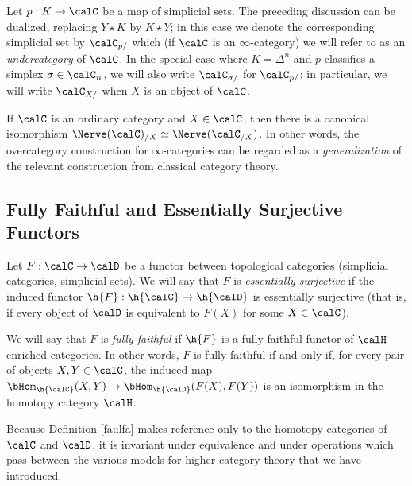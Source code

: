 \begin{remark} Let $p: K \rightarrow \calC$ be a map of simplicial sets. The
preceding discussion can be dualized, replacing $Y \star K$
by $K \star Y$; in this case we denote the corresponding simplicial set
by $\calC_{p/}$ which (if $\calC$ is an $\infty$-category) we will refer to as an
{\it undercategory} of $\calC$. In the special case where $K = \Delta^n$ and $p$ classifies a simplex $\sigma \in \calC_{n}$, we will also write $\calC_{\sigma/}$ for $\calC_{p/}$; in particular, we will write $\calC_{X/}$ when $X$ is an object of $\calC$.
\end{remark}

\begin{remark}
If $\calC$ is an ordinary category and $X \in \calC$,
then there is a canonical isomorphism $\Nerve(\calC)_{/X} \simeq \Nerve (\calC_{/X})$. In other words, the overcategory construction for $\infty$-categories can be regarded as a {\em generalization} of the relevant construction from classical category theory.
\end{remark}

\subsection{Fully Faithful and Essentially Surjective Functors}

\begin{definition}\label{faulfa}
Let $F: \calC \rightarrow \calD$ be a functor between topological categories (simplicial categories, simplicial sets). We will say that $F$ is {\it essentially surjective} if the induced functor 
$\h{F}: \h{\calC} \rightarrow \h{\calD}$ is essentially surjective (that is, if every object of $\calD$ is
equivalent to $F(X)$ for some $X \in \calC$). 

We will say that $F$ is {\it fully faithful} if $\h{F}$ is a fully faithful functor of $\calH$-enriched categories. In other words, $F$ is fully faithful if and only if, for every pair of objects
$X, Y \in \calC$, the induced map
$\bHom_{\h{\calC}}(X,Y) \rightarrow \bHom_{\h{\calD}}(F(X),F(Y))$ is an isomorphism in the homotopy category $\calH$. 
\end{definition}

\begin{remark}
Because Definition \ref{faulfa} makes reference only to the homotopy categories of $\calC$ and $\calD$, it is invariant under equivalence and under operations which pass between
the various models for higher category theory that we have introduced.
\end{remark}

